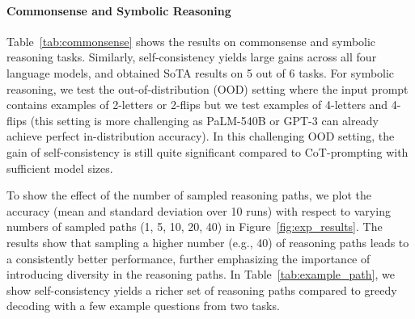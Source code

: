 \documentclass{article} %
\begin{document}
\vspace{-0.1in}
\paragraph{Commonsense and Symbolic Reasoning}
Table~\ref{tab:commonsense} shows the results on commonsense and symbolic reasoning tasks. Similarly, self-consistency yields large gains across all four language models, and obtained SoTA results on 5 out of 6 tasks.
For symbolic reasoning, we test the out-of-distribution (OOD) setting where the input prompt contains examples of 2-letters or 2-flips but we test examples of 4-letters and 4-flips (this setting is more challenging as PaLM-540B or GPT-3 can already achieve perfect in-distribution accuracy).
In this challenging OOD setting, the gain of self-consistency is still quite significant compared to CoT-prompting with sufficient model sizes.

To show the effect of the number of sampled reasoning paths, we plot the accuracy (mean and standard deviation over 10 runs) with respect to varying numbers of sampled paths (1, 5, 10, 20, 40) in Figure~\ref{fig:exp_results}.
The results show that sampling a higher number (e.g., 40) of reasoning paths leads to a consistently better performance, further emphasizing the importance of introducing diversity in the reasoning paths.
In Table~\ref{tab:example_path}, we show self-consistency yields a richer set of reasoning paths compared to greedy decoding with a few example questions from two tasks. 
\end{document}
